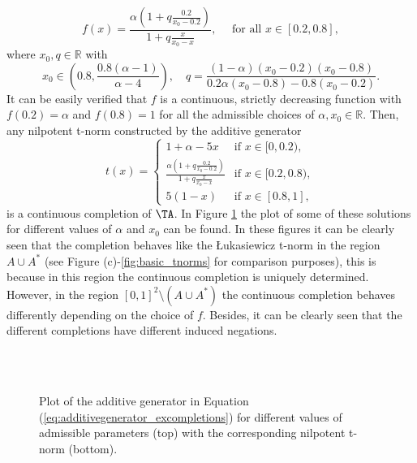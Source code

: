 \begin{example}
\begin{itemize}
		$$
		f(x)=\frac{\alpha \left( 1+q\frac{0.2}{x_0-0.2} \right)}{1+q\frac{x}{x_0-x}}, \quad \text{ for all } x \in [0.2,0.8],
		$$
		where $x_0,q \in \mathbb{R}$ with
		$$x_0 \in \left( 0.8, \frac{0.8(\alpha-1)}{\alpha-4}\right), \quad q=\frac{(1-\alpha)(x_0-0.2)(x_0-0.8)}{0.2\alpha(x_0-0.8)-0.8(x_0-0.2)}.$$ 
		It can be easily verified that $f$ is a continuous, strictly decreasing function with $f(0.2)=\alpha$ and $f(0.8)=1$ for all the admissible choices of $\alpha,x_0 \in \mathbb{R}$. Then, any nilpotent t-norm constructed by the additive generator
		\begin{equation}\label{eq:additivegenerator_excompletions}
			t(x)
			=
			\left\{ \begin{array}{ll}
				1 + \alpha -5x  & \text{if } x \in [0,0.2), \\[8pt]
				\frac{\alpha \left( 1+q\frac{0.2}{x_0-0.2} \right)}{1+q\frac{x}{x_0-x}} & \text{if } x \in [0.2,0.8),\\[8pt]
				5 (1 - x) & \text{if } x \in [0.8,1],
			\end{array} \right.
		\end{equation}
		is a continuous completion of $\TA$. In Figure \ref{fig:nonuniquecompletions}  the plot of some of these solutions for different values of $\alpha$ and $x_0$ can be found. In these figures it can be clearly seen that the completion behaves like the Łukasiewicz t-norm in the region $A \cup A^*$ (see Figure (c)-\ref{fig:basic_tnorms} for comparison purposes), this is because in this region the continuous completion is uniquely determined. However, in the region $[0,1]^2 \setminus (A \cup A^*)$ the continuous completion behaves differently depending on the choice of $f$. Besides, it can be clearly seen that the different completions have different induced negations.
		\begin{figure}[t]
			\centering
			\\[2ex]
			\setcounter{subfigure}{0}
			\\
			\caption{Plot of the additive generator in Equation (\ref{eq:additivegenerator_excompletions}) for different values of admissible parameters (top) with the corresponding nilpotent t-norm (bottom).}\label{fig:nonuniquecompletions}
		\end{figure}
	\end{itemize}
\end{example}

